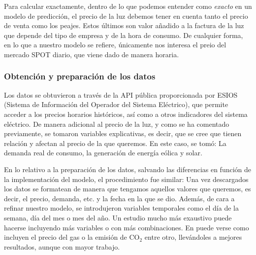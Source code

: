 Para calcular exactamente, dentro de lo que podemos entender como \textit{exacto} en un modelo de predicción, el precio de la luz debemos tener en cuenta tanto el precio de venta como los peajes. Estos últimos son valor añadido a la factura de la luz que depende del tipo de empresa y de la hora de consumo. De cualquier forma, en lo que a nuestro modelo se refiere, únicamente nos interesa el preio del mercado SPOT diario, que viene dado de manera horaria.
%
%
%
\subsubsection{Obtención y preparación de los datos}
%
%
%
Los datos se obtuvieron a través de la API pública proporcionada por ESIOS (Sistema de Información del Operador del Sistema Eléctrico), que permite acceder a los precios horarios históricos, así como a otros indicadores del sistema eléctrico. De manera adicional al precio de la luz, y como se ha comentado previamente, se tomaron variables explicativas, es decir, que se cree que tienen relación y afectan al precio de la que queremos. En este caso, se tomó: La demanda real de consumo, la generación de energía eólica y solar.

En lo relativo a la preparación de los datos, salvando las diferencias en función de la implementación del modelo, el procedimiento fue similar: Una vez descargados los datos se formatean de manera que tengamos aquellos valores que queremos, es decir, el precio, demanda, etc. y la fecha en la que se dio. Además, de cara a refinar nuestro modelo, se introdujeron variables temporales como el día de la semana, día del mes o mes del año. Un estudio mucho más exaustivo puede hacerse incluyendo más variables o con más combinaciones. En \cite{TFG_prediccion} puede verse como incluyen el precio del gas o la emisión de CO$_2$ entre otro, llevándoles a mejores resultados, aunque con mayor trabajo.
%
%
%
